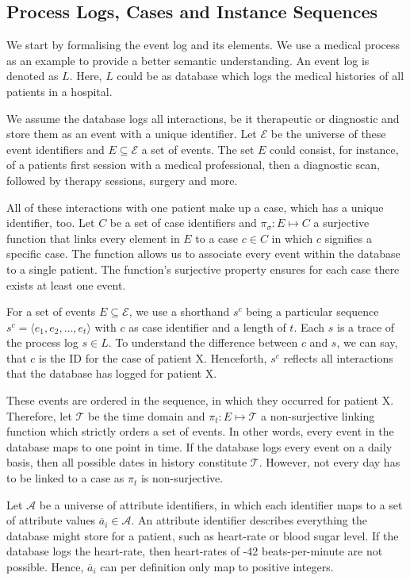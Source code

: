 \documentclass[./../../paper.tex]{subfiles}
\begin{document}
\subsection{Process Logs, Cases and Instance Sequences}


We start by formalising the event log and its elements. We use a medical process as an example to provide a better semantic understanding. An event log is denoted as $L$. Here, $L$ could be as database which logs the medical histories of all patients in a hospital. 

We assume the database logs all interactions, be it therapeutic or diagnostic and store them as an event with a unique identifier. Let $\mathcal{E}$ be the universe of  these event identifiers and $E \subseteq \mathcal{E}$ a set of events. The set $E$ could consist, for instance, of a patients first session with a medical professional, then a diagnostic scan, followed by therapy sessions, surgery and more. 

All of these interactions with one patient make up a case, which has a unique identifier, too. Let $C$ be a set of case identifiers and $\pi_\sigma : E \mapsto C$ a surjective function that links every element in $E$ to a case $c \in C$ in which $c$ signifies a specific case. The function allows us to associate every event within the database to a single patient. The function's surjective property ensures for each case there exists at least one event.

For a set of events $E \subseteq \mathcal{E}$, we use a shorthand $s^c$ being a particular sequence $s^c = \langle e_1, e_2, \ldots, e_t \rangle$ with $c$ as case identifier and a length of $t$. Each $s$ is a trace of the process log $s \in L$. To understand the difference between $c$ and $s$, we can say, that $c$ is the ID for the case of patient X. Henceforth, $s^c$ reflects all interactions that the database has logged for patient X. 


These events are ordered in the sequence, in which they occurred for patient X.  Therefore, let $\mathcal{T}$ be the time domain and $\pi_t : E \mapsto \mathcal{T}$ a non-surjective linking function which strictly orders a set of events. In other words, every event in the database maps to one point in time. If the database logs every event on a daily basis, then all possible dates in history constitute $\mathcal{T}$. However, not every day has to be linked to a case as $\pi_t$ is non-surjective. 

Let $\mathcal{A}$ be a universe of attribute identifiers,  in which each identifier maps to a set of attribute values $\overline{a}_i \in \mathcal{A}$. An attribute identifier describes everything the database might store for a patient, such as heart-rate or blood sugar level. If the database logs the heart-rate, then heart-rates of -42 beats-per-minute are not possible. Hence, $\overline{a}_i$ can per definition only map to positive integers. 
\end{document}
